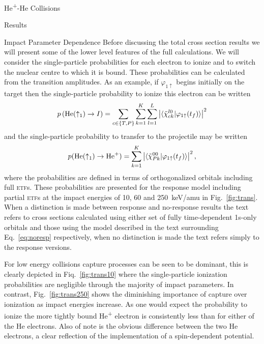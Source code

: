 \documentclass[letterpaper, 11 pt]{report}
\begin{document}
\begin{chapter}{\texorpdfstring{He\textsuperscript{+}}{He+}-He Collisions \label{chap:hephe}}
\begin{section}{Results \label{sec:hephe-disc}}
\begin{subsection}{Impact Parameter Dependence}
         Before discussing the total cross section results we will present some of the lower level
         features of the full calculations. We will consider the single-particle probabilities for each
         electron to ionize and to switch the nuclear centre to which it is bound. These probabilities
         can be calculated from the transition amplitudes. As an example, if $\varphi_{1 \uparrow}$
         begins initially on the target then the single-particle probability to ionize this electron can
         be written
         \begin{equation} \label{eq:ionprob}
            p \left( \mathrm{He}(\uparrow_1) \rightarrow I \right) =
               \sum\limits_{c \in \{T,P\}} \sum\limits_{k=1}^K \sum\limits_{l = 1}^L
               \left| \braket{ \tilde{\chi}^{l0}_{c k} | \varphi_{1 \uparrow}(t_f)} \right|^2
         \end{equation}
         and the single-particle probability to transfer to the projectile may be written
         \begin{equation} \label{eq:transprob}
            p(\mathrm{He}(\uparrow_1) \rightarrow \mathrm{He}^+) =
               \sum\limits_{k=1}^K \left| \braket{ \tilde{\chi}^{00}_{P k} | \varphi_{1 \uparrow}(t_f)}
                          \right|^2,
         \end{equation}
         where the probabilities are defined in terms of orthogonalized orbitals including full
         \textsc{etf}s. These probabilities are presented for the response model including partial
         \textsc{etf}s at the impact energies of 10, 60 and 250~keV/amu in Fig.~\ref{fig:trans}. When a
         distinction is made between response and no-response results the text refers to cross sections
         calculated using either set of fully time-dependent 1s-only orbitals and those using the model
         described in the text surrounding Eq.~\eqref{eq:noresp} respectively, when no distinction is
         made the text refers simply to the response versions.

         For low energy collisions capture processes can be seen to be dominant, this is clearly
         depicted in Fiq.~\ref{fig:trans10} where the single-particle ionization probabilities are
         negligible through the majority of impact parameters. In contrast, Fig.~\ref{fig:trans250}
         shows the diminishing importance of capture over ionization as impact energies increase.
         As one would expect the probability to ionize the more tightly bound He\textsuperscript{+}
         electron is consistently less than for either of the He electrons. Also of note is the obvious
         difference between the two He electrons, a clear reflection of the implementation of a
         spin-dependent potential.


\end{subsection}
\end{section}
\end{chapter}
\end{document}
